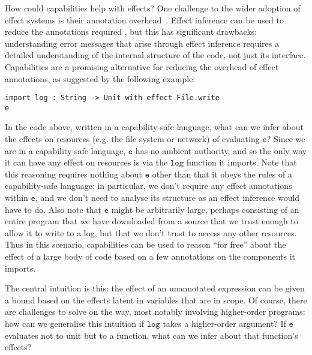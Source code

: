 \documentclass[sigplan,10pt,review]{acmart}\settopmatter{printfolios=true,printccs=false,printacmref=false}
\newcommand{\kwat}[1]{$\kwa{#1}$}
\newcommand{\kwa}[1]{\mathtt{#1}}
\newcommand{\epscalc}{\kwa{CC}}
\begin{document}
How could capabilities help with effects?
One challenge to the wider adoption of effect systems is their annotation overhead~\cite{rytz12}.
Effect inference can be used to reduce the annotations required
, but this has significant drawbacks: understanding error messages that arise through effect inference requires a detailed understanding of the internal structure of the code, not just its interface.
Capabilities are a promising alternative for reducing the overhead of effect annotations, as suggested by the following example:

\begin{lstlisting}
import log : String -> Unit with effect File.write
e
\end{lstlisting}

In the code above, written in a capability-safe language, what can we infer about the effects on resources (e.g. the file system or network) of evaluating \kwat{e}?
Since we are in a capability-safe language, \kwat{e} has no ambient authority, and so the only way it can have any effect on resources is via the \kwat{log} function it imports.
Note that this reasoning requires nothing about \kwat{e} other than that it obeys the rules of a capability-safe language; in particular, we don't require any effect annotations within \kwat{e}, and we don't need to analyse its structure as an effect inference would have to do.
Also note that \kwat{e} might be arbitrarily large, perhaps consisting of an entire program that we have downloaded from a source that we trust enough to allow it to write to a log, but that we don't trust to access any other resources.
Thus in this scenario, capabilities can be used to reason ``for free'' about the effect of a large body of code based on a few annotations on the components it imports.

The central intuition is this: the effect of an unannotated expression can be given a bound based on the effects latent in variables that are in scope.
Of course, there are challenges to solve on the way, most notably involving higher-order programs: how can we generalise this intuition if \kwat{log} takes a higher-order argument?
If \kwat{e} evaluates not to unit but to a function, what can we infer about that function's effects?

%
\end{document}
